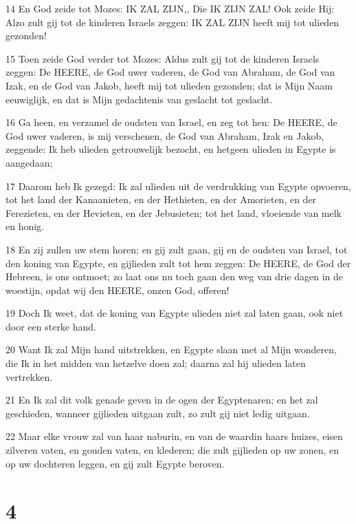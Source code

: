 \par 14 En God zeide tot Mozes: IK ZAL ZIJN,, Die IK ZIJN ZAL! Ook zeide Hij: Alzo zult gij tot de kinderen Israels zeggen: IK ZAL ZIJN heeft mij tot ulieden gezonden!
\par 15 Toen zeide God verder tot Mozes: Aldus zult gij tot de kinderen Israels zeggen: De HEERE, de God uwer vaderen, de God van Abraham, de God van Izak, en de God van Jakob, heeft mij tot ulieden gezonden; dat is Mijn Naam eeuwiglijk, en dat is Mijn gedachtenis van geslacht tot geslacht.
\par 16 Ga heen, en verzamel de oudsten van Israel, en zeg tot hen: De HEERE, de God uwer vaderen, is mij verschenen, de God van Abraham, Izak en Jakob, zeggende: Ik heb ulieden getrouwelijk bezocht, en hetgeen ulieden in Egypte is aangedaan;
\par 17 Daarom heb Ik gezegd: Ik zal ulieden uit de verdrukking van Egypte opvoeren, tot het land der Kanaanieten, en der Hethieten, en der Amorieten, en der Ferezieten, en der Hevieten, en der Jebusieten; tot het land, vloeiende van melk en honig.
\par 18 En zij zullen uw stem horen; en gij zult gaan, gij en de oudsten van Israel, tot den koning van Egypte, en gijlieden zult tot hem zeggen: De HEERE, de God der Hebreen, is ons ontmoet; zo laat ons nu toch gaan den weg van drie dagen in de woestijn, opdat wij den HEERE, onzen God, offeren!
\par 19 Doch Ik weet, dat de koning van Egypte ulieden niet zal laten gaan, ook niet door een sterke hand.
\par 20 Want Ik zal Mijn hand uitstrekken, en Egypte slaan met al Mijn wonderen, die Ik in het midden van hetzelve doen zal; daarna zal hij ulieden laten vertrekken.
\par 21 En Ik zal dit volk genade geven in de ogen der Egyptenaren; en het zal geschieden, wanneer gijlieden uitgaan zult, zo zult gij niet ledig uitgaan.
\par 22 Maar elke vrouw zal van haar naburin, en van de waardin haars huizes, eisen zilveren vaten, en gouden vaten, en klederen; die zult gijlieden op uw zonen, en op uw dochteren leggen, en gij zult Egypte beroven.

\chapter{4}

